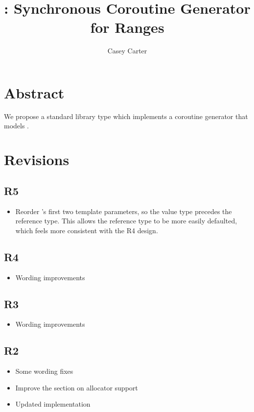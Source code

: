 \documentclass{wg21}
\title{\tcode{std::generator}: Synchronous Coroutine Generator for Ranges}
\author{Casey Carter}{Casey@Carter.net}
\begin{document}
\maketitle


\section{Abstract}

We propose a standard library type 
which implements a coroutine generator
that models .


\section{Revisions}

\subsection{R5}
\begin{itemize}
\item Reorder 's first two template parameters,
  so the value type precedes the reference type.
  This allows the reference type to be more easily defaulted,
  which feels more consistent with the R4 design.
\end{itemize}

\subsection{R4}
\begin{itemize}
\item Wording improvements
\end{itemize}

\subsection{R3}
\begin{itemize}
\item Wording improvements
\end{itemize}

\subsection{R2}
\begin{itemize}
\item Some wording fixes
\item Improve the section on allocator support
\item Updated implementation
\end{itemize}
\end{document}
